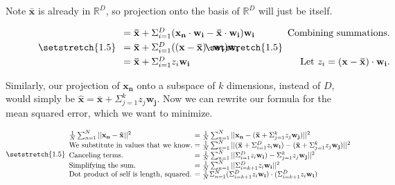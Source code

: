 \documentclass{article}
\begin{document}
\noindent Note $\mathbf{\bar{x}}$ is already in $\mathbb{R}^D$, so projection onto the basis of $\mathbb{R}^D$ will just be itself.

\vspace{2mm}
\noindent
\[
\begin{minipage}{.5\linewidth}
  \centering
  $
  \setstretch{1.5}
  \begin{array}{l@{{}\mathrel{=}{}}l}
    &\mathbf{\bar{x}} + \Sigma_{i=1}^{D}(\mathbf{x_n \cdot w_i - \bar{x} \cdot w_i)w_i}\\[\jot]
    &\mathbf{\bar{x}} + \Sigma_{i=1}^{D}((\mathbf{x - \bar{x}}) \cdot \mathbf{w_i})\mathbf{w_i}\\[\jot]
    &\mathbf{\bar{x}} + \Sigma_{i = 1}^{D}z_{i}\mathbf{w_i}
  \end{array}$
\end{minipage}%
\begin{minipage}{.35\linewidth}
  \centering
  $
  \setstretch{1.5}
  \begin{array}{r}
    \text{Combining summations.}\\[\jot]
    \\[\jot]
    \text{Let }z_{i} = (\mathbf{x - \bar{x}}) \cdot \mathbf{w_i}.
  \end{array}$
\end{minipage}
\]

\noindent Similarly, our projection of $\mathbf{x_n}$ onto a subspace of $k$ dimensions, instead of $D$, would simply be $\mathbf{\hat{x}} = \mathbf{\bar{x}} + \Sigma_{j=1}^{k}z_{j}\mathbf{w_j}$. Now we can rewrite our formula for the mean squared error, which we want to minimize.

\vspace{2mm}
$
\setstretch{1.5}
\begin{array}{l@{{}\mathrel{=}{}}l}
    \frac{1}{N}\sum_{n=1}^{N}||\mathbf{x_n - \hat{x}}||^2 & \frac{1}{N}\sum_{n=1}^{N}||\mathbf{x_n} - (\mathbf{\bar{x}} + \Sigma_{j=1}^{k}z_{j}\mathbf{w_j})||^2\\
    \text{We substitute in values that we know.} & \frac{1}{N}\sum_{n=1}^{N}||(\mathbf{\bar{x}} + \Sigma_{i = 1}^{D}z_{i}\mathbf{w_i}) - (\mathbf{\bar{x}} + \Sigma_{j=1}^{k}z_{j}\mathbf{w_j})||^2\\
    \text{Canceling terms.}&\frac{1}{N}\sum_{n=1}^{N}||\Sigma_{i = 1}^{D}z_{i}\mathbf{w_i}) - \Sigma_{j=1}^{k}z_{j}\mathbf{w_j}||^2\\
    \text{Simplifying the sum.}&\frac{1}{N}\sum_{n=1}^{N}||\Sigma_{i = k+1}^{D}z_{i}\mathbf{w_i}||^2\\
    \text{Dot product of self is length, squared.}&\frac{1}{N}\Sigma_{n=1}^{N}(\Sigma_{i=k+1}^{D}z_i\mathbf{w_i})\cdot(\Sigma_{i=k+1}^{D}z_i\mathbf{w_i})\\
\end{array}$
\end{document}
